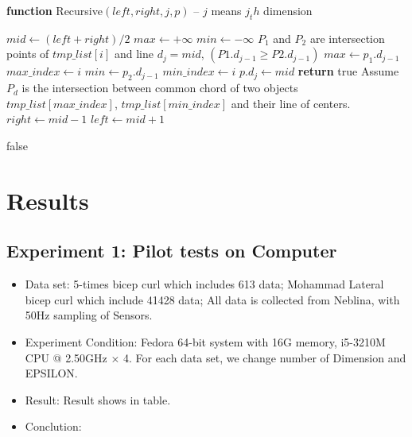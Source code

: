 \documentclass[10pt, conference, compsocconf]{IEEEtran}
\newcommand{\todo}[1]{\marginpar{\parbox{18mm}{\flushleft\tiny\color{red}\textbf{TODO}:
      #1}}}
\begin{document}
\begin{algorithm}
    \begin{flushleft}
        \textbf{function} Recursive$(left, right, j, p)$  -- $j$ means $j_th$ dimension
    \end{flushleft}
    \begin{algorithmic}[1]
            \STATE $mid \gets (left + right)/2$
            \STATE $max \gets +\infty$
            \STATE $min \gets -\infty$
                \STATE $P_1$ and $P_2$ are intersection points of $tmp\_list[i]$ and line $d_{j}=mid$, $(P1.d_{j-1}\geqslant P2.d_{j-1})$
                    \STATE $max \gets p_1.d_{j-1}$
                    \STATE $max\_index \gets i$
                \ENDIF
                    \STATE $min \gets p_2.d_{j-1}$
                    \STATE $min\_index \gets i$
                \ENDIF
            \ENDFOR
                \STATE $p.d_j \gets mid$
                    \STATE \textbf{return} true
                \ENDIF
            \ENDIF
            \STATE Assume $P_d$ is the intersection between common chord of two objects $tmp\_list[max\_index]$, $tmp\_list[min\_index]$ and their line of centers.
                \STATE $right \gets mid-1$
                \STATE $left \gets mid+1$
            \ENDIF

        \ENDWHILE
        \RETURN false
    \end{algorithmic}
\end{algorithm}



\section{Results}
\todo{ result table ?}
\subsection{Experiment 1: Pilot tests on Computer}
\begin{itemize}
    \item Data set: 5-times bicep curl which includes 613 data; 
                    Mohammad Lateral bicep curl which include 41428 data; 
                    All data is collected from Neblina, with 50Hz sampling of Sensors.
    \item Experiment Condition: Fedora 64-bit system with 16G memory, i5-3210M CPU @ 2.50GHz × 4. For each data set, we change number of Dimension and EPSILON.
    \item Result: Result shows in table.
    \item Conclution: 
\end{itemize}
\end{document}
